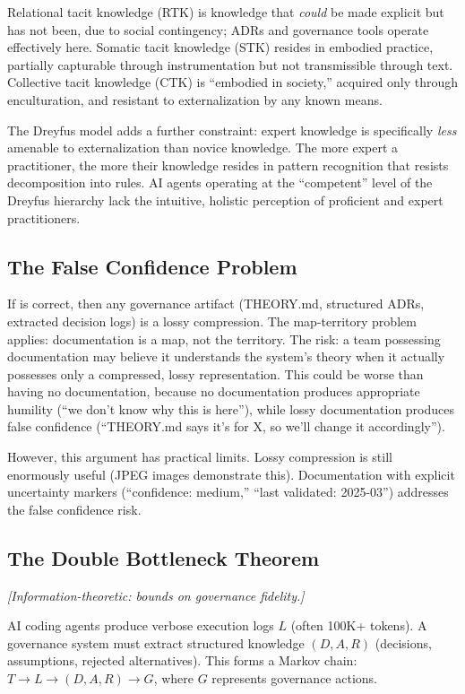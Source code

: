 \documentclass[11pt, a4paper]{googledeepmind}
\begin{document}
Relational tacit knowledge (RTK) is knowledge that \emph{could} be made explicit but has not been, due to social contingency; ADRs and governance tools operate effectively here. Somatic tacit knowledge (STK) resides in embodied practice, partially capturable through instrumentation but not transmissible through text. Collective tacit knowledge (CTK) is ``embodied in society,'' acquired only through enculturation, and resistant to externalization by any known means.

The Dreyfus model adds a further constraint: expert knowledge is specifically \emph{less} amenable to externalization than novice knowledge. The more expert a practitioner, the more their knowledge resides in pattern recognition that resists decomposition into rules. AI agents operating at the ``competent'' level of the Dreyfus hierarchy lack the intuitive, holistic perception of proficient and expert practitioners.

\subsection{The False Confidence Problem}

If \citet{naur1985} is correct, then any governance artifact (THEORY.md, structured ADRs, extracted decision logs) is a lossy compression. The map-territory problem applies: documentation is a map, not the territory. The risk: a team possessing documentation may believe it understands the system's theory when it actually possesses only a compressed, lossy representation. This could be worse than having no documentation, because no documentation produces appropriate humility (``we don't know why this is here''), while lossy documentation produces false confidence (``THEORY.md says it's for X, so we'll change it accordingly'').

However, this argument has practical limits. Lossy compression is still enormously useful (JPEG images demonstrate this). Documentation with explicit uncertainty markers (``confidence: medium,'' ``last validated: 2025-03'') addresses the false confidence risk.

\subsection{The Double Bottleneck Theorem}
\emph{[Information-theoretic: bounds on governance fidelity.]}

AI coding agents produce verbose execution logs $L$ (often 100K+ tokens). A governance system must extract structured knowledge $(D, A, R)$ (decisions, assumptions, rejected alternatives). This forms a Markov chain: $T \to L \to (D, A, R) \to G$, where $G$ represents governance actions.
\end{document}
